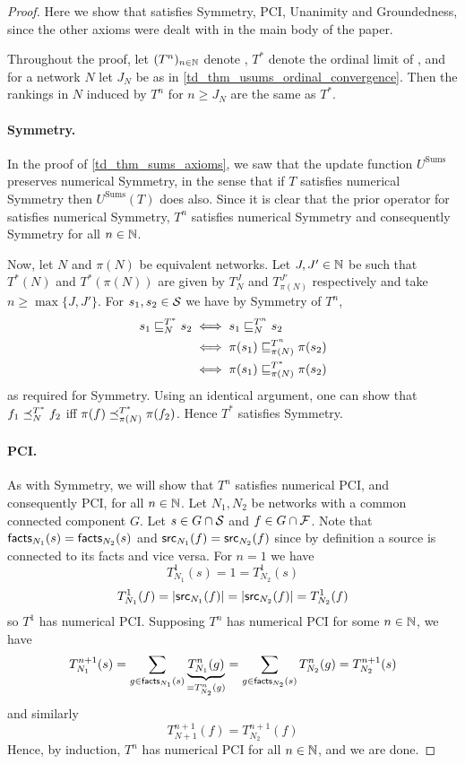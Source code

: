 \begin{proof}

Here we show that \usums{} satisfies Symmetry, PCI, Unanimity and Groundedness,
since the other axioms were dealt with in the main body of the paper.

Throughout the proof, let $(T^n)_{n \in \Nat}$ denote \usums{}, $T^*$ denote
the ordinal limit of \usums{}, and for a network $N$ let $J_N$ be as in
\cref{td_thm_usums_ordinal_convergence}. Then the rankings in $N$ induced by $T^n$
for $n \ge J_N$ are the same as $T^*$.

\paragraph{Symmetry.} In the proof of \cref{td_thm_sums_axioms}, we saw
that the update function $U^{\text{Sums}}$ preserves numerical Symmetry, in the
sense that if $T$ satisfies numerical Symmetry then $U^{\text{Sums}}(T)$ does
also. Since it is clear that the prior operator for \usums{} satisfies
numerical Symmetry, $T^n$ satisfies numerical Symmetry and consequently
Symmetry for all $n \in \Nat$.

Now, let $N$ and $\pi(N)$ be equivalent networks. Let $J, J' \in \Nat$ be
such that $T^*(N)$ and $T^*(\pi(N))$ are given by $T_N^J$ and
$T_{\pi(N)}^{J'}$ respectively and take $n \ge \max\{J, J'\}$. For $s_1, s_2
\in \S$ we have by Symmetry of $T^n$,
\begin{align*}
    s_1 \sle_N^{T^*} s_2
    & \iff s_1 \sle_N^{T^n} s_2 \\
    & \iff \pi(s_1) \sle_{\pi(N)}^{T^n} \pi(s_2) \\
    & \iff \pi(s_1) \sle_{\pi(N)}^{T^*} \pi(s_2)
\end{align*}
as required for Symmetry. Using an identical argument, one can show that $f_1
\fle_N^{T^*} f_2$ iff $\pi(f) \fle_{\pi(N)}^{T^*} \pi(f_2)$. Hence $T^*$
satisfies Symmetry.

\paragraph{PCI.}
As with Symmetry, we will show that $T^n$ satisfies numerical
PCI, and consequently PCI, for all $n \in \Nat$. Let $N_1,
N_2$ be networks with a common connected component $G$. Let $s \in G \cap \S$
and $f \in G \cap \F$. Note that $\facts_{N_1}(s) = \facts_{N_2}(s)$ and
$\src_{N_1}(f) = \src_{N_2}(f)$ since by definition a source is connected to
its facts and vice versa. For $n = 1$ we have
\[
    T_{N_1}^1(s) = 1 = T_{N_2}^1(s)
\]
\[
    T_{N_1}^1(f) = |\src_{N_1}(f)| = |\src_{N_2}(f)| = T_{N_2}^1(f)
\]
so $T^1$ has numerical PCI. Supposing $T^n$ has numerical PCI for some $n \in
\Nat$, we have
\[
    T_{N_1}^{n+1}(s)
    = \sum_{g \in \facts_{N_1}(s)}{
        \underbrace{T_{N_1}^n(g)}_{=T_{N_2}^n(g)}
    }
    = \sum_{g \in \facts_{N_2}(s)}{
        T_{N_2}^n(g)
    }
    = T_{N_2}^{n+1}(s)
\]
and similarly
\[
    T_{N+1}^{n+1}(f) = T_{N_2}^{n+1}(f)
\]
Hence, by induction, $T^n$ has numerical PCI for all $n \in \Nat$, and we are
done.


\end{proof}
